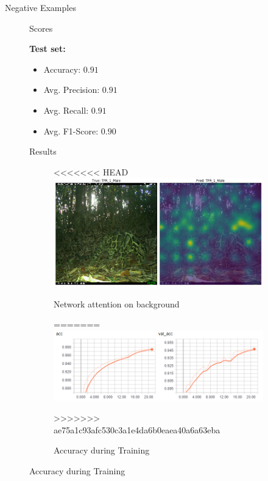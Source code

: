 \documentclass[10pt]{beamer}
\begin{document}
\begin{frame}{Negative Examples}
\begin{figure}
\begin{frame}{Scores}
\begin{minipage}[c]{0.58\linewidth}
\begin{figure}
		\end{figure}
	\end{minipage}
	\begin{minipage}[c]{0.38\linewidth}
		\textbf{Test set:}
		\begin{itemize}
			\item Accuracy: $0.91$
			\item Avg. Precision: $0.91$      
			\item Avg. Recall: $0.91$
			\item Avg. F1-Score: $0.90$
		\end{itemize}
	\end{minipage}
\end{frame}

\begin{frame}{Results}
	\centering
	\begin{figure}
<<<<<<< HEAD
		\includegraphics[width=\columnwidth]{images/result_leo_3.png}
		\caption{Network attention on background}
=======
		\includegraphics[width=.9\columnwidth,height=\textheight,keepaspectratio]{images/acc.png}
		\caption{Accuracy during Training}
>>>>>>> ae75a1c93afc530c3a1e4da6b0eaea40a6a63eba
	\end{figure}
\end{frame}




\end{figure}
\end{frame}
\end{document}
